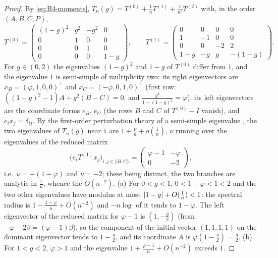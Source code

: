 \begin{proof}
By \eqref{eq:B4-moments}, $T_n(g)=T^{(0)}+\frac1nT^{(1)}+\frac1{n^2}T^{(2)}$ with, in the order $(A,B,C,P)$,
\[
T^{(0)}=\begin{pmatrix}(1-g)^2&g^2&-g^2&0\\0&1&0&0\\0&0&1&0\\0&0&0&1-g\end{pmatrix},\qquad
T^{(1)}=\begin{pmatrix}0&0&0&0\\1&-1&0&0\\0&0&-2&2\\1-g&-g&g&-(1-g)\end{pmatrix}.
\]
For $g\in(0,2)$ the eigenvalues $(1-g)^2$ and $1-g$ of $T^{(0)}$ differ from $1$, and the eigenvalue $1$ is semi-simple of multiplicity two: its right eigenvectors are $x_B=(\varphi,1,0,0)^\top$ and $x_C=(-\varphi,0,1,0)^\top$ (first row: $((1-g)^2-1)A+g^2(B-C)=0$, and $\frac{g^2}{1-(1-g)^2}=\varphi$), its left eigenvectors are the coordinate forms $e_B$, $e_C$ (the rows $B$ and $C$ of $T^{(0)}-I$ vanish), and $e_ix_j=\delta_{ij}$. By the first-order perturbation theory of a semi-simple eigenvalue \cite[Chapter~II, \S2.3]{kato1995perturbation}, the two eigenvalues of $T_n(g)$ near $1$ are $1+\frac\nu n+o(\frac1n)$, $\nu$ running over the eigenvalues of the reduced matrix
\[
\big(e_iT^{(1)}x_j\big)_{i,j\in\{B,C\}}=\begin{pmatrix}\varphi-1&-\varphi\\0&-2\end{pmatrix},
\]
i.e.\ $\nu=-(1-\varphi)$ and $\nu=-2$; these being distinct, the two branches are analytic in $\frac1n$, whence the $O(n^{-2})$. (a) For $0<g<1$, $0<1-\varphi<1<2$ and the two other eigenvalues have modulus at most $\left|1-g\right|+O(\frac1n)<1$: the spectral radius is $1-\frac{1-\varphi}n+O(n^{-2})$ and $-n\log$ of it tends to $1-\varphi$. The left eigenvector of the reduced matrix for $\varphi-1$ is $(1,-\frac g2)$ (from $-\varphi-2\beta=(\varphi-1)\beta$), so the component of the initial vector $(1,1,1,1)$ on the dominant eigenvector tends to $1-\frac g2$, and its coordinate $A$ is $\varphi(1-\frac g2)=\frac g2$. (b) For $1<g<2$, $\varphi>1$ and the eigenvalue $1+\frac{\varphi-1}n+O(n^{-2})$ exceeds $1$.
\end{proof}

